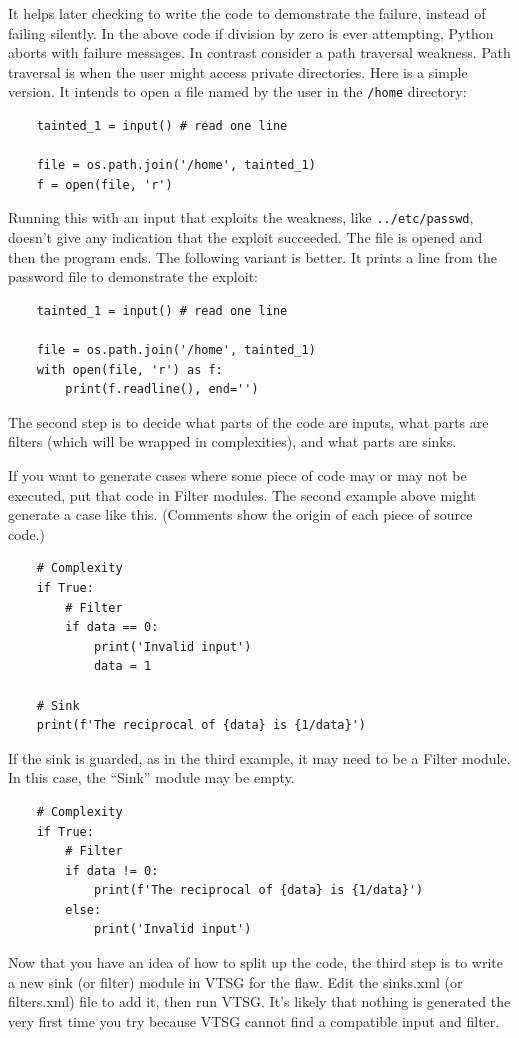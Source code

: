 \documentclass[12pt]{article}
\begin{document}
It helps later checking to write the code to demonstrate the failure, instead of
failing silently.  In the above code if division by zero is ever attempting, Python
aborts with failure messages.  In contrast consider a path traversal weakness.  Path
traversal is when the user might access private directories.  Here is a simple
version.  It intends to open a file named by the user in the \verb|/home| directory:
\begin{verbatim}
    tainted_1 = input() # read one line

    file = os.path.join('/home', tainted_1)
    f = open(file, 'r')
\end{verbatim}
Running this with an input that exploits the weakness, like
\verb|../etc/passwd|, doesn't give any indication that the exploit succeeded.  The
file is opened and then the program ends.  The following variant is better.  It
prints a line from the password file to demonstrate the exploit:
\begin{verbatim}
    tainted_1 = input() # read one line

    file = os.path.join('/home', tainted_1)
    with open(file, 'r') as f:
        print(f.readline(), end='')
\end{verbatim}


The second step is to decide what parts of the code are inputs, what parts are
filters (which will be wrapped in complexities), and what parts are sinks.

If you want to generate cases where some piece of code may or may not be executed,
put that code in Filter modules.  The second example above might generate a case
like this.  (Comments show the origin of each piece of source code.)
\begin{verbatim}
    # Complexity
    if True:
        # Filter
        if data == 0:
            print('Invalid input')
            data = 1

    # Sink
    print(f'The reciprocal of {data} is {1/data}')
\end{verbatim}

If the sink is guarded, as in the third example, it may need to be a Filter module.
In this case, the ``Sink'' module may be empty.
\begin{verbatim}
    # Complexity
    if True:
        # Filter
        if data != 0:
            print(f'The reciprocal of {data} is {1/data}')
        else:
            print('Invalid input')
\end{verbatim}


Now that you have an idea of how to split up the code, the third step is to
write a new sink (or filter) module in VTSG for the flaw.  Edit the sinks.xml (or
filters.xml) file to add it, then run VTSG.  It's likely that nothing is
generated the very first time you try because VTSG cannot find a compatible input and
filter.
\end{document}
